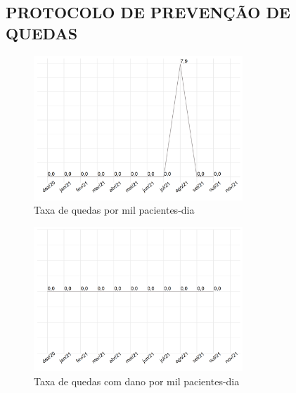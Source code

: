 \documentclass[
  a4paper]{article}
\begin{document}

\newpage
\subsection{PROTOCOLO DE PREVENÇÃO DE QUEDAS}

\begin{figure}[H]
\caption{Taxa de quedas por mil pacientes-dia}
\includegraphics[width=0.7\textwidth]{Imagens/quedas_pacientes_dia.png}
\end{figure}

\begin{figure}[H]
\caption{Taxa de quedas com dano por mil pacientes-dia}
\includegraphics[width=0.7\textwidth]{Imagens/queda_pacientes_dia.png}
\end{figure}
\end{document}
